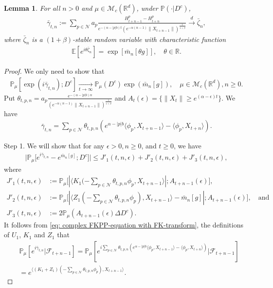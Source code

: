 \documentclass[12pt,a4paper]{amsart}
\theoremstyle{plain}
\newtheorem{lem}[thm]{Lemma}
\theoremstyle{definition}
\numberwithin{equation}{section}
\begin{document}
\begin{lem}
    For all $n>0$ and $\mu\in\mathcal{M}_c(\mathbb{R}^d)$, under $\mathbb{P}(\cdot|D^c)$,
    \begin{align}
        \bar{\gamma}_{t,n}:=\sum_{p\in\mathcal{N}}a_p\frac{H^p_{t+n-1}-H^p_{t+n}}{e^{-(\alpha-|p|b)t}(e^{-\alpha(n-1)}\|X_{t+n-1}\|)^{\frac{1}{1+\beta}}}\xrightarrow{d}\bar{\zeta}_n,
    \end{align}
    where $\bar{\zeta}_n$ is a $(1+\beta)$-stable random variable with characteristic function
    \begin{align}
        \mathbb{E}[e^{i\theta \bar{\zeta}_n}]=\exp[\bar{m}_n[\theta g]],\quad \theta\in \mathbb{R}.
    \end{align}
\end{lem}
\begin{proof}
We only need to show that
\begin{align}
    \mathbb{P}_{\mu}[\exp(i\bar{\gamma}_{t,n}); D^c]
    \xrightarrow[t\rightarrow \infty]{}\mathbb{P}_{\mu}(D^c)\exp(\bar{m}_n[g]),
    \quad \mu \in \mathcal M_c(\mathbb R^d), n \geq 0.
\end{align}
Put
$\theta_{t,p,n}=a_p\frac{e^{-(\alpha-|p|b)n}}{(e^{-\alpha(n-1)}\|X_{t+n-1}\|)^{\frac{1}{1+\beta}}}$ and $A_t(\epsilon)=\{\|X_t\|\geq e^{(\alpha-\epsilon)t}\}$.
We have
\begin{align}
    \bar{\gamma}_{t,n}=\sum_{p\in \mathcal{N}}\theta_{t,p,n}(e^{\alpha-|p|b}\langle \phi_p, X_{t+n-1}\rangle-\langle \phi_p, X_{t+n}\rangle).
\end{align}

	Step 1. We will show that for any $\epsilon > 0, n\geq 0$, and $t\geq 0$, we have
\begin{align}
    \big|\mathbb{P}_{\mu}\big[e^{i\bar{\gamma}_{t,n}}-e^{\bar{m}_n[g]}; D^c\big]\big|
    \leq J'_1(t,n,\epsilon)+J'_2(t,n,\epsilon)+J'_3(t,n,\epsilon),
\end{align}
	where
\begin{align}
\label{eq: Def of JJ1}
	J'_1(t,n,\epsilon)
	&:= \mathbb{P}_{\mu}\big[|\langle K_1(-\sum_{p\in \mathcal{N}}\theta_{t,p,n}\phi_p, X_{t+n-1}\rangle|; A_{t+n-1}(\epsilon) \big],
	\\ J'_2(t,n,\epsilon)
	&:= \mathbb{P}_{\mu}\big[|\langle Z_1(-\sum_{p\in \mathcal{N}}\theta_{t,p,n}\phi_p),X_{t+n-1}\rangle-\bar{m}_n[g]|; A_{t+n-1}(\epsilon)\big],\quad\mbox{and}
	\\ J'_3(t,n, \epsilon)
	&:=2\mathbb{P}_{\mu}(A_{t+n-1}(\epsilon)\Delta D^c).
\end{align}
It follows from \eqref{eq: complex FKPP-equation with FK-transform}, the definitions of $U_1$, $K_1$ and $Z_1$ that
\begin{align}
\label{eq: need11}
    &\displaystyle\mathbb{P}_{\mu}[e^{i\bar{\gamma}_{t,n}}|\mathscr{F}_{t+n-1}]
    =\mathbb{P}_{\mu}[e^{i\sum_{p\in \mathcal{N}}\theta_{t,p,n}(e^{\alpha-|p|b}\langle \phi_p,X_{t+n-1}\rangle-\langle \phi_p, X_{t+n}\rangle)}|\mathscr{F}_{t+n-1}]
    \\&=\displaystyle e^{\langle (K_1+Z_1)(-\sum_{p\in \mathcal{N}}\theta_{t,p,n}\phi_p), X_{t+n-1} \rangle}.
\end{align}


\end{proof}
\end{document}
